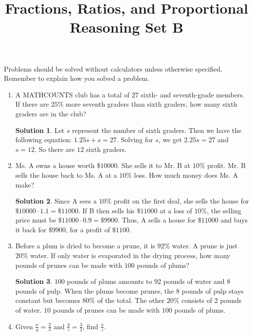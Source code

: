 \documentclass{article}
\title{Fractions, Ratios, and Proportional Reasoning Set B}
\author{}
\date{}
\theoremstyle{definition}
\newtheorem*{solution}{Solution}
\begin{document}
    \maketitle
    \noindent Problems should be solved without calculators unless otherwise
    specified. Remember to explain how you solved a problem.
    \begin{enumerate}
        \item A MATHCOUNTS club has a total of $27$ sixth- and seventh-grade
        members. If there are $25\%$ more seventh graders than sixth graders,
        how many sixth graders are in the club?
        \begin{solution}
            Let $s$ represent the number of sixth graders. Then we have the
            following equation: $1.25s + s = 27$. Solving for $s$, we get $2.25s
            = 27$ and $s = 12$. So there are $12$ sixth graders.
        \end{solution}
        \item Ms. A owns a house worth $\$10000$. She sells it to Mr. B at
        $10\%$ profit. Mr. B sells the house back to Ms. A at a $10\%$ loss. How
        much money does Ms. A make?
        \begin{solution}
            Since A sees a $10\%$ profit on the first deal, she sells the house
            for $\$10000 \cdot 1.1 = \$11000$. If B then sells his $\$11000$ at
            a loss of $10\%$, the selling price must be $\$11000 \cdot 0.9 =
            \$9900$. Thus, A sells a house for $\$11000$ and buys it back for
            $\$9900$, for a profit of $\$1100$.
        \end{solution}
        \item Before a plum is dried to become a prune, it is $92\%$ water. A
        prune is just $20\%$ water. If only water is evaporated in the drying
        process, how many pounds of prunes can be made with $100$ pounds of
        plums?
        \begin{solution}
            $100$ pounds of plums amounts to $92$ pounds of water and $8$ pounds
            of pulp. When the plums become prunes, the $8$ pounds of pulp stays
            constant but becomes $80\%$ of the total. The other $20\%$ consists
            of $2$ pounds of water. $10$ pounds of prunes can be made with $100$
            pounds of plums.
        \end{solution}
        \item Given $\frac{x}{y} = \frac{2}{3}$ and $\frac{y}{z} = \frac{3}{2}$,
        find $\frac{x}{z}$.

\end{enumerate}
\end{document}
